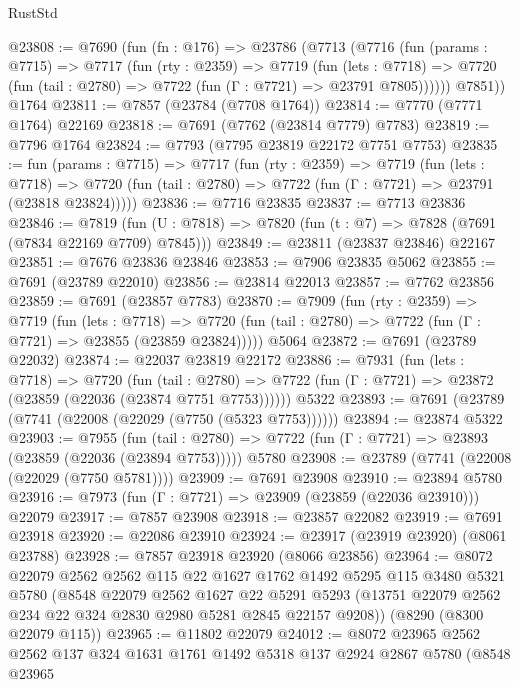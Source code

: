 \begin{lexlean}{RustStd}
\begin{coremodule}
@23808 := @7690
    (fun (fn : @176) =>
    @23786
      (@7713
        (@7716
          (fun (params : @7715) =>
          @7717
            (fun (rty : @2359) =>
            @7719
              (fun (lets : @7718) =>
              @7720 (fun (tail : @2780) => @7722 (fun (Γ : @7721) => @23791 @7805))))))
        @7851))
    @1764
@23811 := @7857 (@23784 (@7708 @1764))
@23814 := @7770 (@7771 @1764) @22169
@23818 := @7691 (@7762 (@23814 @7779) @7783)
@23819 := @7796 @1764
@23824 := @7793 (@7795 @23819 @22172 @7751 @7753)
@23835 := fun (params : @7715) =>
  @7717
    (fun (rty : @2359) =>
    @7719
      (fun (lets : @7718) =>
      @7720 (fun (tail : @2780) => @7722 (fun (Γ : @7721) => @23791 (@23818 @23824)))))
@23836 := @7716 @23835
@23837 := @7713 @23836
@23846 := @7819
    (fun (U : @7818) => @7820 (fun (t : @7) => @7828 (@7691 (@7834 @22169 @7709) @7845)))
@23849 := @23811 (@23837 @23846) @22167
@23851 := @7676 @23836 @23846
@23853 := @7906 @23835 @5062
@23855 := @7691 (@23789 @22010)
@23856 := @23814 @22013
@23857 := @7762 @23856
@23859 := @7691 (@23857 @7783)
@23870 := @7909
    (fun (rty : @2359) =>
    @7719
      (fun (lets : @7718) =>
      @7720 (fun (tail : @2780) => @7722 (fun (Γ : @7721) => @23855 (@23859 @23824)))))
    @5064
@23872 := @7691 (@23789 @22032)
@23874 := @22037 @23819 @22172
@23886 := @7931
    (fun (lets : @7718) =>
    @7720
      (fun (tail : @2780) =>
      @7722 (fun (Γ : @7721) => @23872 (@23859 (@22036 (@23874 @7751 @7753))))))
    @5322
@23893 := @7691 (@23789 (@7741 (@22008 (@22029 (@7750 (@5323 @7753))))))
@23894 := @23874 @5322
@23903 := @7955
    (fun (tail : @2780) => @7722 (fun (Γ : @7721) => @23893 (@23859 (@22036 (@23894 @7753)))))
    @5780
@23908 := @23789 (@7741 (@22008 (@22029 (@7750 @5781))))
@23909 := @7691 @23908
@23910 := @23894 @5780
@23916 := @7973 (fun (Γ : @7721) => @23909 (@23859 (@22036 @23910))) @22079
@23917 := @7857 @23908
@23918 := @23857 @22082
@23919 := @7691 @23918
@23920 := @22086 @23910
@23924 := @23917 (@23919 @23920) (@8061 @23788)
@23928 := @7857 @23918 @23920 (@8066 @23856)
@23964 := @8072
    @22079
    @2562
    @2562
    @115
    @22
    @1627
    @1762
    @1492
    @5295
    @115
    @3480
    @5321
    @5780
    (@8548
      @22079
      @2562
      @1627
      @22
      @5291
      @5293
      (@13751 @22079 @2562 @234 @22 @324 @2830 @2980 @5281 @2845 @22157 @9208))
    (@8290 (@8300 @22079 @115))
@23965 := @11802 @22079
@24012 := @8072
    @23965
    @2562
    @2562
    @137
    @324
    @1631
    @1761
    @1492
    @5318
    @137
    @2924
    @2867
    @5780
    (@8548
      @23965

\end{coremodule}
\end{lexlean}
